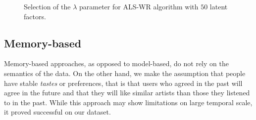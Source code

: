 \documentclass[10pt,a4paper]{article}
\begin{document}
    \begin{figure}
      \center
        \hfill
      \caption{Selection of the $\lambda$ parameter for \textsc{ALS-WR} algorithm with $50$ latent factors.}
      \label{fig:model-based-predictors-plots}
    \end{figure}

  \subsection{Memory-based}
  Memory-based approaches, as opposed to model-based, do not rely on the semantics of the data. On the other hand, we make the assumption that people have stable \textit{tastes} or preferences, that is that users who agreed in the past will agree in the future and that they will like similar artists than those they listened to in the past. While this approach may show limitations on large temporal scale, it proved successful on our dataset.\\
\end{document}

